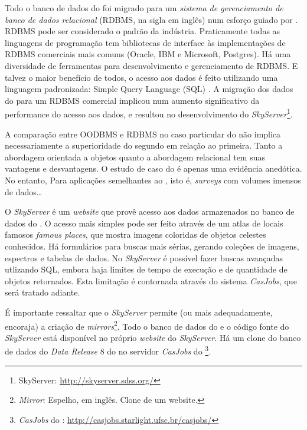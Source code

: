 Todo o banco de dados do \SDSS foi migrado para um {\em sistema de gerenciamento
de banco de dados relacional} (RDBMS, na sigla em inglês) num esforço guiado por
\citet{Thakar2004}. RDBMS pode ser considerado o padrão da indústria.
Praticamente todas as linguagens de programação tem bibliotecas de interface às
implementações de RDBMS comerciais mais comuns (Oracle, IBM e Microsoft,
Postgres). Há uma diversidade de ferramentas para desenvolvimento e
gerenciamento de RDBMS. E talvez o maior benefício de todos, o acesso aos dados
é feito utilizando uma linguagem padronizada: Simple Query Language (SQL)
\citep{Codd1970}. A migração dos dados do \SDSS para um RDBMS comercial implicou
num aumento significativo da performance do acesso aos dados, e resultou no
desenvolvimento do {\em SkyServer}\footnote{SkyServer:
\url{http://skyserver.sdss.org/}}.

A comparação entre OODBMS e RDBMS no caso particular do \SDSS não implica
necessariamente a superioridade do segundo em relação ao primeira. Tanto a
abordagem orientada a objetos quanto a abordagem relacional tem suas vantagens e
desvantagens. O estudo de caso do \SDSS é apenas uma evidência anedótica. No
entanto, Para aplicações semelhantes ao \SDSS, isto é, {\em surveys} com volumes
imensos de dados\ldots\fixme

O {\em SkyServer} é um {\em website} que provê acesso aos dados armazenados no
banco de dados do \SDSS \citep{Szalay2002}. O acesso mais simples pode ser feito
através de um atlas de locais famosos {\em famous places}, que mostra imagens
coloridas de objetos celestes conhecidos. Há formulários para buscas mais
sérias, gerando coleções de imagens, espectros e tabelas de dados. No {\em
SkyServer} é possível fazer buscas avançadas utlizando SQL, embora haja limites
de tempo de execução e de quantidade de objetos retornados. Esta limitação é
contornada através do sistema {\em CasJobs}, que será tratado adiante.

É importante ressaltar que o {\em SkyServer} permite (ou mais adequadamente,
encoraja) a criação de {\em mirrors}\footnote{{\em Mirror}: Espelho, em inglês.
Clone de um website.}. Todo o banco de dados do \SDSS e o código fonte do {\em
SkyServer} está disponível no próprio {\em website} do {\em SkyServer}. Há um
clone do banco de dados do {\em Data Release} 8 do \SDSS no servidor {\em
CasJobs} do \starlight \footnote{{\em CasJobs} do \starlight:
\url{http://casjobs.starlight.ufsc.br/casjobs/}}.

